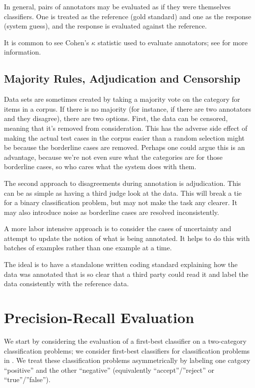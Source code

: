 In general, pairs of annotators may be evaluated as if they were
themselves classifiers.  One is treated as the reference (gold
standard) and one as the response (system guess), and the response
is evaluated against the reference.  

It is common to see Cohen's $\kappa$ statistic used to evaluate
annotators; see  for more information.


\subsection{Majority Rules, Adjudication and Censorship}

Data sets are sometimes created by taking a majority vote on the
category for items in a corpus.  If there is no majority (for
instance, if there are two annotators and they disagree), there are
two options.  First, the data can be censored, meaning that it's
removed from consideration.  This has the adverse side effect of
making the actual test cases in the corpus easier than a random
selection might be because the borderline cases are removed.  Perhaps
one could argue this is an advantage, because we're not even sure what
the categories are for those borderline cases, so who cares what the
system does with them.  

The second approach to disagreements during annotation is
adjudication.  This can be as simple as having a third judge look at
the data.  This will break a tie for a binary classification problem,
but may not make the task any clearer.  It may also introduce noise
as borderline cases are resolved inconsistently.

A more labor intensive approach is to consider the cases of
uncertainty and attempt to update the notion of what is being
annotated.  It helps to do this with batches of examples rather than
one example at a time.  

The ideal is to have a standalone written coding standard explaining
how the data was annotated that is so clear that a third party could
read it and label the data consistently with the reference data.  


\section{Precision-Recall Evaluation}

We start by considering the evaluation of a first-best classifier on a
two-category classification problems; we consider first-best
classifiers for classification problems in
.  We treat these
classification problems asymmetrically by labeling one catgory
``positive'' and the other ``negative'' (equivalently
``accept''/''reject'' or ``true''/''false'').


